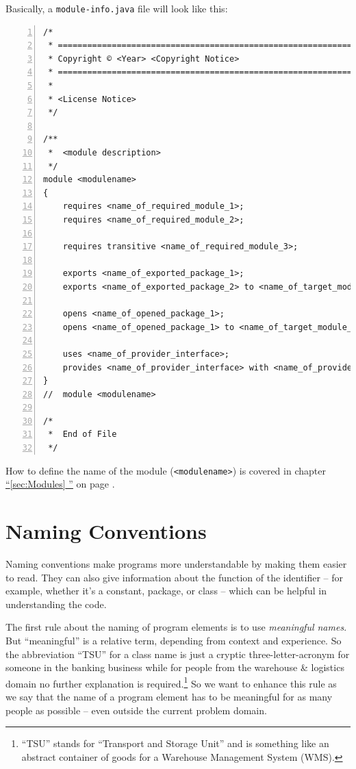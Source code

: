 \documentclass[12pt,a4paper,titlepage, parskip=half, headsepline, footsepline, cleardoubleplain]{scrbook}
\newcommand*{\tqfullvref}[1]{\hyperref[{#1}]{“\ref*{#1} \nameref*{#1}”} on page \pageref{#1}}
\begin{document}
Basically, a \verb#module-info.java# file will look like this:
\begin{lstlisting}[numbers=left, caption={module-info.java}]
/*
 * ==================================================================
 * Copyright © <Year> <Copyright Notice>
 * ==================================================================
 *
 * <License Notice>
 */
 
/**
 *  <module description>
 */ 
module <modulename> 
{
    requires <name_of_required_module_1>;
    requires <name_of_required_module_2>;

    requires transitive <name_of_required_module_3>;

    exports <name_of_exported_package_1>;
    exports <name_of_exported_package_2> to <name_of_target_module_1>;

    opens <name_of_opened_package_1>;
    opens <name_of_opened_package_1> to <name_of_target_module_1>, <name_of_target_module_2>;

    uses <name_of_provider_interface>;
    provides <name_of_provider_interface> with <name_of_provider_implementation>;
}
//  module <modulename>

/*
 *  End of File
 */
\end{lstlisting}
How to define the name of the module (\lstinline|<modulename>|) is covered in chapter \tqfullvref{sec:Modules}.

\chapter{Naming Conventions}
Naming conventions make programs more understandable by making them easier to read. They can also give information about the function of the identifier – for example, whether it's a constant, package, or class – which can be helpful in understanding the code.

The first rule about the naming of program elements is to use \textit{meaningful names}. But “meaningful” is a relative term, depending from context and experience. So the abbreviation “TSU” for a class name is just a cryptic three-letter-acronym for someone in the banking business while for people from the warehouse \& logistics domain no further explanation is required.\footnote{“TSU” stands for “Transport and Storage Unit” and is something like an abstract container of goods for a Warehouse Management System (WMS).} So we want to enhance this rule as we say that the name of a program element has to be meaningful for as many people as possible – even outside the current problem domain.
\end{document}

